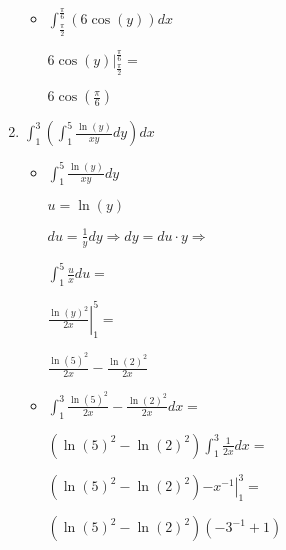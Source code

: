 \documentclass[../practica_08.tex]{subfiles}
\begin{document}
\begin{enumerate}
\begin{itemize}
                \item $\int_{\frac{\pi}{2}}^{\frac{\pi}{6}}(6 \cos(y)) dx$
                
                    $ \left. 6 \cos(y) \right |_{\frac{\pi}{2}}^{\frac{\pi}{6}} =$

                    $ 6\cos(\frac{\pi}{6})$

            \end{itemize}

        \item $ \int_1^3(\int_1^5 \frac{\ln(y)}{xy} dy) dx $
        
            \begin{itemize}
                \item $\int_1^5 \frac{\ln(y)}{xy} dy$
                
                    $ u = \ln(y) $

                    $du = \frac{1}{y} dy \Rightarrow dy = du\cdot y \Rightarrow$

                    $\int_1^5 \frac{u}{x} du =$

                    $\left. \frac{\ln(y)^2}{2x} \right |_1^5= $

                    $ \frac{\ln(5)^2}{2x} - \frac{\ln(2)^2}{2x}$

                \item $\int_1^3 \frac{\ln(5)^2}{2x} - \frac{\ln(2)^2}{2x} dx = $
                
                    $ (\ln(5)^2 - \ln(2)^2)\int_1^3 \frac{1}{2x} dx = $

                    $ (\ln(5)^2 - \ln(2)^2) \left. -x^{-1} \right |_1^3 = $

                    $ (\ln(5)^2 - \ln(2)^2)(-3^{-1}+1)$

            \end{itemize}

    \end{enumerate}
\end{document}
